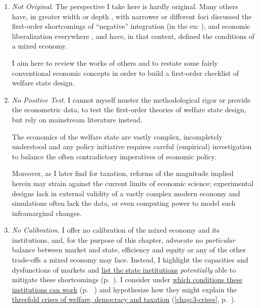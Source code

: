 \begin{enumerate}
	\item \label{itm:not-original} \emph{Not Original}.
	The perspective I take here is hardly original.
	Many others have, in greater width \citep{Stiglitz2002} or depth \citep{Sinn2004}, with narrower \citep{Scharpf1997} or different foci \citep{Zurn-2000-aa} discussed the first-order shortcomings of ``negative'' integration (in the \gls{eu}:
	\citealt{Scharpf1997}), and economic liberalization everywhere \citep{Stiglitz2002}, and have, in that context, defined the conditions of a mixed economy.

	I aim here to review the works of others and to restate some fairly conventional economic concepts in order to build a first-order checklist of welfare state design.

	\item \label{itm:no-test} \emph{No Positive Test}.
	I cannot myself muster the methodological rigor or provide the econometric data, to test the first-order theories of welfare state design, but rely on mainstream literature instead.

	The economics of the welfare state are vastly complex, incompletely understood and any policy initiative requires careful (empirical) investigation to balance the often contradictory imperatives of economic policy.

	Moreover, as I later find for taxation, reforms of the magnitude implied herein may strain against the current limits of economic science:
	experimental designs lack in external validity of a vastly complex modern economy and simulations often lack the data, or even computing power to model such inframarginal changes.

	\item \label{itm:no-calibration} \emph{No Calibration}.
	I offer no calibration of the mixed economy and its institutions, and, for the purpose of this chapter, advocate no \emph{particular} balance between market and state, efficiency and equity or any of the other trade-offs a mixed economy may face.
	Instead, I highlight the capacities and dysfunctions of markets and \hyperref[sec:ends]{list the state institutions} \emph{potentially} able to mitigate these shortcomings (p.~\pageref{sec:ends}).
	I consider under \hyperref[sec:means]{which conditions these institutions can work} (p.~ \pageref{sec:means}) and hypothesize how they might explain the \hyperref[chap:3-crises]{threefold crises of welfare, democracy and taxation} (\autoref{chap:3-crises}, p.~\pageref{chap:3-crises}).


\end{enumerate}
